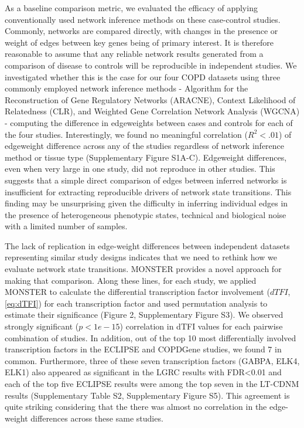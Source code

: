 \documentclass[9pt,twocolumn,twoside]{pnas-new}
\begin{document}
As a baseline comparison metric, we evaluated the efficacy of applying
conventionally used network inference methods on these case-control
studies. Commonly, networks are compared directly, with changes in
the presence or weight of edges between key genes being of primary
interest. It is therefore reasonable to assume that any reliable network
results generated from a comparison of disease to controls will be
reproducible in independent studies. We investigated whether this
is the case for our four COPD datasets using three commonly employed
network inference methods - Algorithm for the Reconstruction of Gene
Regulatory Networks (ARACNE)\cite{margolin2006aracne}, Context Likelihood
of Relatedness (CLR)\cite{faith2007large}, and Weighted Gene Correlation
Network Analysis (WGCNA) \cite{zhang2005general} - computing the
difference in edgeweights between cases and controls for each of the
four studies. Interestingly, we found no meaningful correlation ($R^{2}<.01$)
of edgeweight difference across any of the studies regardless of network
inference method or tissue type (Supplementary Figure S1A-C). Edgeweight
differences, even when very large in one study, did not reproduce
in other studies. This suggests that a simple direct comparison of
edges between inferred networks is insufficient for extracting reproducible
drivers of network state transitions. This finding may be unsurprising
given the difficulty in inferring individual edges in the presence
of heterogeneous phenotypic states, technical and biological noise
with a limited number of samples. 

The lack of replication in edge-weight differences between independent
datasets representing similar study designs indicates that we need
to rethink how we evaluate network state transitions. MONSTER provides
a novel approach for making that comparison. Along these lines, for
each study, we applied MONSTER to calculate the differential transcription
factor involvement ($dTFI$, \ref{eq:dTFI}) for each transcription
factor and used permutation analysis to estimate their significance
(Figure 2, Supplementary Figure S3). We observed strongly significant
($p<1e-15$) correlation in dTFI values for each pairwise combination
of studies. In addition, out of the top 10 most differentially involved
transcription factors in the ECLIPSE and COPDGene studies, we found
7 in common. Furthermore, three of these seven transcription factors
(GABPA, ELK4, ELK1) also appeared as significant in the LGRC results
with FDR<0.01 and each of the top five ECLIPSE results were among
the top seven in the LT-CDNM results (Supplementary Table S2, Supplementary
Figure S5). This agreement is quite striking considering that the
there was almost no correlation in the edge-weight differences across
these same studies. 
\end{document}
